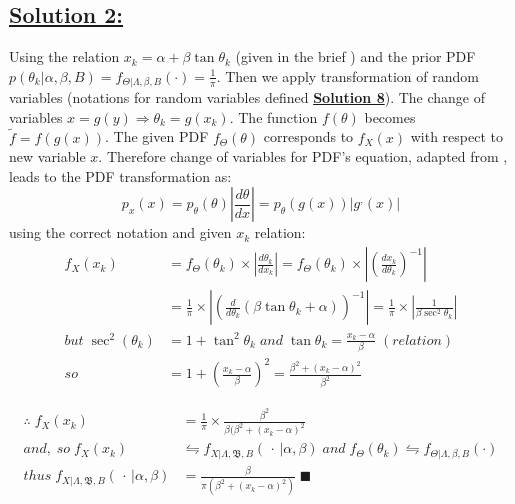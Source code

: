 \documentclass[a4paper,11pt]{article}
\begin{document}
\subsection*{\underline{Solution 2:}}
\label{sec:proof}
Using the relation $x_k = \alpha + \beta \tan \theta_k$ (given in the brief \cite{vanWyk2024}) and the prior PDF $p(\theta_k | \alpha, \beta, B) = f_{\Theta | \Lambda, \beta, B}(\cdot) = \frac{1}{\pi}$. Then we apply transformation of random variables (notations for random variables defined \hyperref[sec:notation]{\textbf{Solution 8}}). The change of variables  $x = g(y) \Rightarrow \theta_k = g(x_k)$. The function $f(\theta)$ becomes $\tilde{f} = f(g(x))$. The given PDF $f_\Theta (\theta)$ corresponds to $f_X (x)$ with respect to new variable $x$. Therefore change of variables for PDF's equation, adapted from \cite{bishop2006pattern}, leads to the PDF transformation as:
\begin{equation}
	p_x(x) = p_\theta(\theta) \left| \frac{d\theta}{dx} \right| = p_\theta (g(x))|g^,(x)|
\end{equation}
using the correct notation and given $x_k$ relation:
\begin{align}
	f_X(x_k) &= f_\Theta (\theta_k) \times \left| \frac{d\theta_k}{dx_k} \right| = f_\Theta (\theta_k) \times \left| \left(\frac{dx_k}{d\theta_k} \right)^{-1} \right| \\
	&= \frac{1}{\pi} \times \left| \left( \frac{d}{d\theta_k}(\beta \tan \theta_k + \alpha) \right)^{-1}  \right| =\frac{1}{\pi} \times \left| \frac{1}{\beta \sec^2\theta_k} \right| \nonumber\\
	but \; \sec^2(\theta_k) &= 1 + \tan^2\theta_k \; and \; \tan\theta_k = \frac{x_k - \alpha}{\beta} \; (relation)\\
	so \; &= 1 + \left(\frac{x_k - \alpha}{\beta} \right)^2 = \frac{\beta^2 + (x_k - \alpha)^2}{\beta^2} \nonumber
\end{align}
	
\begin{align}
	\therefore \; f_X(x_k) &= \frac{1}{\pi} \times \frac{\beta^2}{\beta(\beta^2 + (x_k - \alpha)^2}\\
	and, \; so \; f_X(x_k) &\leftrightharpoons f_{X | \Lambda, \mathfrak{B}, B}(\, \cdot \, | \alpha, \beta) \; and \; f_\Theta (\theta_k) \leftrightharpoons f_{\Theta | \Lambda, \beta, B}(\cdot) \nonumber\\
	thus \; f_{X | \Lambda, \mathfrak{B}, B}(\, \cdot \, | \alpha, \beta) &= \frac{\beta}{\pi (\beta^2 + (x_k - \alpha)^2)} \; \blacksquare
\end{align}
\end{document}
